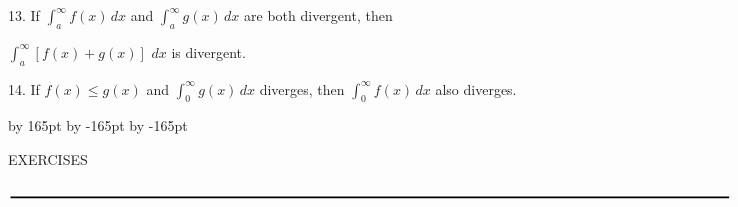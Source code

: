 \documentclass{sebase}
\begin{document}
\begin{multicols}{2}
\begin{ExerciseList}
%

\item[\hfill 13.] If $\int_{a}^{\infty }f\left( x\right) \,dx$ and $%
\int_{a}^{\infty }g\left( x\right) \,dx$ are both divergent, then

$\int_{a}^{\infty }[f\left( x\right) +g(x)]\,\,dx$ is divergent.

%

%

\item[\hfill 14.] If $f\left( x\right) \leq g\left( x\right) $ and $%
\int_{0}^{\infty }g\left( x\right) \,dx$ diverges, then $\int_{0}^{\infty
}f\left( x\right) \,dx$ also diverges.

%
\end{ExerciseList}

\end{multicols}
\advance \leftskip by 165pt
\advance\hsize by -165pt
\advance\linewidth by -165pt%
\vspace*{-9pt}

EXERCISES\vspace{-18pt}

\vspace{12pt}\hskip-170pt\hfil%
\vspace{-6pt}$\rule{7.15in}{0.02in}$%
\vspace{12pt}\hfil%
\end{document}
